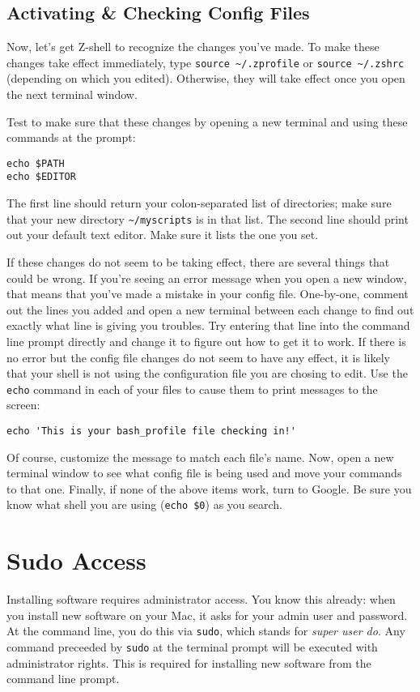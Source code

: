 \documentclass[12pt, letterpaper]{article}
\begin{document}
\subsection{Activating \& Checking Config Files}
Now, let's get Z-shell to recognize the changes you've made.
To make these changes take effect immediately, type
{\tt source \textasciitilde/.zprofile} or {\tt source \textasciitilde/.zshrc}
(depending on which you edited).
Otherwise, they will take effect once you open the next terminal window.

Test to make sure that these changes by opening a new terminal and using these
commands at the prompt:
\begin{verbatim}
echo $PATH
echo $EDITOR
\end{verbatim}
The first line should return your colon-separated list of directories; make sure
that your new directory {\tt \textasciitilde/myscripts} is in that list.
The second line should print out your default text editor.  Make sure it lists
the one you set.

If these changes do not seem to be taking effect, there are several things that
could be wrong.  If you're seeing an error message when you open a new window,
that means that you've made a mistake in your config file.  One-by-one,
comment out the lines you added and open a new terminal between each change to
find out exactly what line is giving you troubles.  Try entering that line
into the command line prompt directly and change it to figure out how to get it
to work.  If there is no error but the config file changes do not seem to have
any effect, it is likely that your shell is not using the configuration file
you are chosing to edit.  Use the {\tt echo} command in each of your files
to cause them to print messages to the screen:
\begin{verbatim}
echo 'This is your bash_profile file checking in!'
\end{verbatim}
Of course, customize the message to match each file's name.  Now, open a new
terminal window to see what config file is being used and move your commands
to that one.  Finally, if none of the above items work, turn to Google.  Be
sure you know what shell you are using ({\tt echo \$0}) as you search.

\section{Sudo Access}
Installing software requires administrator access.  You know this already:
when you install new software on your Mac, it asks for your admin user and
password.  At the command line, you do this via {\tt sudo}, which stands
for \emph{super user do}.  Any command preceeded by {\tt sudo} at the
terminal prompt will be executed with administrator rights.  This is required
for installing new software from the command line prompt.
\end{document}
